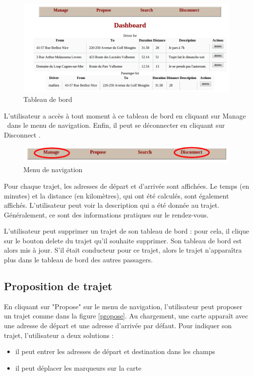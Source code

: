 \documentclass[a4paper]{article}
\begin{document}
\begin{figure}[!ht]
	\centering
	\includegraphics[scale=0.5]{Dashboard.png}
	\caption{\label{dashboard} Tableau de bord}
\end{figure}

L'utilisateur a accès à tout moment à ce tableau de bord en cliquant
sur \og Manage \fg\ dans le menu de navigation. Enfin, il peut se
déconnecter en cliquant sur \og Disconnect \fg.

\begin{figure}[!ht]
	\centering
	\includegraphics[scale=0.4]{Menu.png}
	\caption{\label{menu} Menu de navigation}
\end{figure}

\newpage

Pour chaque trajet, les adresses de départ et d'arrivée sont affichées.
Le temps (en minutes) et la distance (en kilomètres), qui ont été calculés,
sont également affichés. L'utilisateur peut voir la description qui a été
donnée au trajet. Généralement, ce sont des informations pratiques sur
le rendez-vous.

L'utilisateur peut supprimer un trajet de son tableau de bord : pour cela,
il clique sur le bouton \og delete \fg du trajet qu'il souhaite supprimer.
Son tableau de bord est alors mis à jour. S'il était conducteur pour ce
trajet, alors le trajet n'apparaîtra plus dans le tableau de bord des
autres passagers. 

\subsection{Proposition de trajet}

En cliquant sur "Propose" sur le menu de navigation, l'utilisateur peut
proposer un trajet comme dans la figure \ref{propose}. Au chargement,
une carte apparaît avec une adresse de départ et une adresse d'arrivée
par défaut. Pour indiquer son trajet, l'utilisateur a deux solutions 
:
\begin{itemize}
	\item il peut entrer les adresses de départ et destination dans les champs
	\item il peut déplacer les marqueurs sur la carte
\end{itemize}
\end{document}
